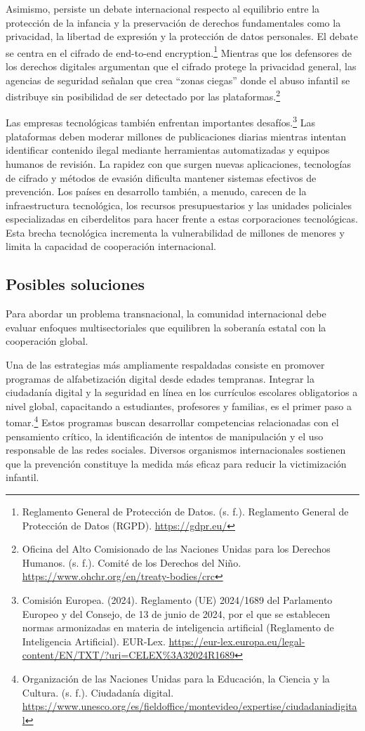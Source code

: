 Asimismo, persiste un debate internacional respecto al equilibrio entre la protección de la infancia y la preservación de derechos fundamentales como la privacidad, la libertad de expresión y la protección de datos personales. El debate se centra en el cifrado de end-to-end encryption.\footnote{Reglamento General de Protección de Datos. (s. f.). Reglamento General de Protección de Datos (RGPD). \url{https://gdpr.eu/}} Mientras que los defensores de los derechos digitales argumentan que el cifrado protege la privacidad general, las agencias de seguridad señalan que crea “zonas ciegas” donde el abuso infantil se distribuye sin posibilidad de ser detectado por las plataformas.\footnote{Oficina del Alto Comisionado de las Naciones Unidas para los Derechos Humanos. (s. f.). Comité de los Derechos del Niño. \url{https://www.ohchr.org/en/treaty-bodies/crc}}

Las empresas tecnológicas también enfrentan importantes desafíos.\footnote{Comisión Europea. (2024). Reglamento (UE) 2024/1689 del Parlamento Europeo y del Consejo, de 13 de junio de 2024, por el que se establecen normas armonizadas en materia de inteligencia artificial (Reglamento de Inteligencia Artificial). EUR-Lex. \url{https://eur-lex.europa.eu/legal-content/EN/TXT/?uri=CELEX\%3A32024R1689}} Las plataformas deben moderar millones de publicaciones diarias mientras intentan identificar contenido ilegal mediante herramientas automatizadas y equipos humanos de revisión. La rapidez con que surgen nuevas aplicaciones, tecnologías de cifrado y métodos de evasión dificulta mantener sistemas efectivos de prevención. Los países en desarrollo también, a menudo, carecen de la infraestructura tecnológica, los recursos presupuestarios y las unidades policiales especializadas en ciberdelitos para hacer frente a estas corporaciones tecnológicas. Esta brecha tecnológica incrementa la vulnerabilidad de millones de menores y limita la capacidad de cooperación internacional.

\subsection{Posibles soluciones}

Para abordar un problema transnacional, la comunidad internacional debe evaluar enfoques multisectoriales que equilibren la soberanía estatal con la cooperación global.

Una de las estrategias más ampliamente respaldadas consiste en promover programas de alfabetización digital desde edades tempranas. Integrar la ciudadanía digital y la seguridad en línea en los currículos escolares obligatorios a nivel global, capacitando a estudiantes, profesores y familias, es el primer paso a tomar.\footnote{Organización de las Naciones Unidas para la Educación, la Ciencia y la Cultura. (s. f.). Ciudadanía digital. \url{https://www.unesco.org/es/fieldoffice/montevideo/expertise/ciudadaniadigital}} Estos programas buscan desarrollar competencias relacionadas con el pensamiento crítico, la identificación de intentos de manipulación y el uso responsable de las redes sociales. Diversos organismos internacionales sostienen que la prevención constituye la medida más eficaz para reducir la victimización infantil.

